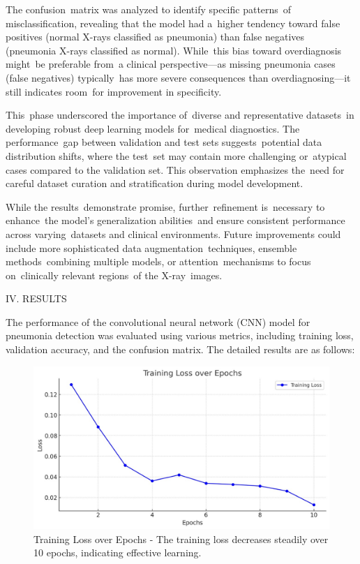 \documentclass[
  twocolumn,
  10pt,
  a4paper,
  journal
]{IEEEtran}
\begin{document}
The confusion~matrix was analyzed to identify specific patterns~of
misclassification, revealing that the model had a~higher tendency toward
false positives (normal X-rays classified as pneumonia) than false
negatives (pneumonia X-rays classified as normal). While~this bias
toward overdiagnosis might~be preferable from~a clinical
perspective---as missing pneumonia cases (false negatives) typically~has
more severe consequences than overdiagnosing---it still indicates
room~for improvement in specificity.

This~phase underscored the importance of~diverse and representative
datasets~in developing robust deep learning models for~medical
diagnostics. The performance~gap between validation and test sets
suggests~potential data distribution shifts, where the test~set may
contain more challenging or~atypical cases compared to the validation
set. This observation emphasizes the~need for careful dataset curation
and stratification during model development.

While the results~demonstrate promise, further~refinement is~necessary
to enhance~the model's generalization abilities~and
ensure consistent performance across varying~datasets and clinical
environments. Future improvements could include more sophisticated data
augmentation~techniques, ensemble methods~combining multiple models, or
attention~mechanisms to focus on~clinically relevant regions~of the
X-ray~images.

IV. RESULTS

The performance of the convolutional neural network (CNN) model for
pneumonia detection was evaluated using various metrics, including
training loss, validation accuracy, and the confusion matrix. The
detailed results are as follows:

\begin{figure}[!t]
\centering
\includegraphics[width=\columnwidth]{figures/figure4.jpeg}
\caption{Training Loss over Epochs - The training loss decreases steadily over 10 epochs, indicating effective learning.}
\label{fig:training_loss}
\end{figure}
\end{document}
